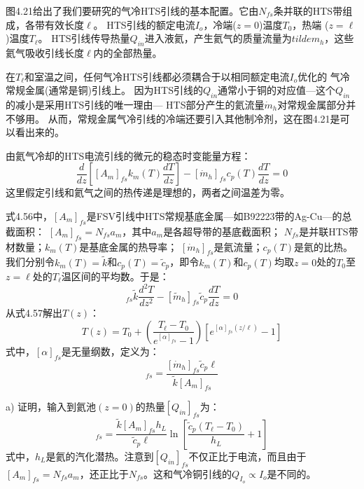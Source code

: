 图4.21给出了我们要研究的气冷HTS引线的基本配置。它由$N_{fs}$条并联的HTS带组成，各带有效长度$\ell$。
HTS引线的额定电流$I_o$，冷端($z=0$)温度$T_0$，热端 ($z =\ell$)温度$T_\ell$。
HTS引线传导热量$Q_{in}$进入液氦，产生氦气的质量流量为$tilde{m}_h$，这些氦气吸收引线长度$\ell$内的全部热量。

在$T_\ell$和室温之间，任何气冷HTS引线都必须耦合于以相同额定电流$I_o$优化的
气冷常规金属(通常是铜)引线上。
因为HTS引线的$Q_{in}$通常小于铜的对应值---这个$Q_{in}$的减小是采用HTS引线的唯一理由---
HTS部分产生的氦流量$\dot{m}_h$对常规金属部分并不够用。
从而，常规金属气冷引线的冷端还要引入其他制冷剂，这在图4.21是可以看出来的。

由氦气冷却的HTS电流引线的微元的稳态时变能量方程：
\begin{equation}%
\frac{d}{dz}\left[[A_m]_{fs}k_m(T)\frac{dT}{dz}\right]-[\dot{m}_h]_{fs}c_p(T)\frac{dT}{dz}=0
\end{equation}
这里假定引线和氦气之间的热传递是理想的，两者之间温差为零。

式4.56中，$[A_m]_{fs}$是FSV引线中HTS常规基底金属---如B92223带的Ag-Cu---的总截面积：
$[A_m]_{fs}=N_{fs} a_m$，其中$a_m$是各超导带的基底截面积；
$N_{fs}$是并联HTS带材数量；$k_m(T)$是基底金属的热导率；
$[\dot{m}_h]_{fs}$是氦流量；$c_p(T)$是氦的比热。
我们分别令$k_m(T)=\tilde{k}$和$c_p(T)=\tilde{c}_p$，即令$k_m(T)$和$c_p(T)$均取$z=0$处的$T_0$至$z=\ell$处的$T_\ell$温区间的平均数。于是：
\begin{equation}%
[A_m]_{fs}\tilde{k}\frac{d^2T}{dz^2}-[\tilde{m}_h]_{fs}\tilde{c}_p\frac{dT}{dz}=0
\end{equation}
从式4.57解出$T(z)$：
\begin{equation}%
T(z)=T_0+\left(\frac{T_\ell-T_0}{e^{[\alpha]_{fs}}-1}\right)\left[e^{[\alpha]_{fs}(z/\ell)}-1\right]
\end{equation}
式中，$[\alpha]_{fs}$是无量纲数，定义为：
\begin{equation}%
[\alpha]_{fs}=\frac{[\dot{m}_h]_{fs}\tilde{c}_p\ell}{\tilde{k}[A_m]_{fs}}
\end{equation}

a) 证明，输入到氦池$(z=0)$的热量$[Q_{in}]_{fs}$为：
\begin{equation}%
[Q_{in}]_{fs}=\frac{\tilde{k}[A_m]_{fs}h_L}{\tilde{c}_p\ell}\ln\left[\frac{\tilde{c}_p(T_\ell-T_0)}{h_L}+1\right]
\end{equation}
式中，$h_L$是氦的汽化潜热。注意到$[Q_{in}]_{fs}$不仅正比于电流，而且由于$[A_m]_{fs}= N_{fs} a_m$，还正比于$N_{fs}$。这和气冷铜引线的$Q_{I_o}\propto I_o$是不同的。

